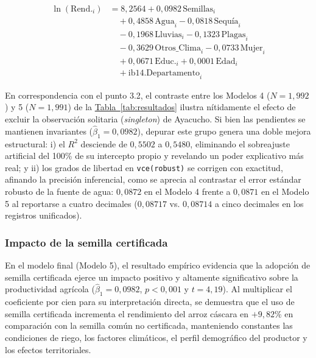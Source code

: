 \documentclass[11pt,a4paper,twocolumn]{article}
\begin{document}
\begin{equation}
\begin{split}
\ln(\text{Rend.}_i) &= 8{,}2564 + 0{,}0982 \, \text{Semillas}_i \\
&\quad + 0{,}4858 \, \text{Agua}_i - 0{,}0818 \, \text{Sequía}_i \\
&\quad - 0{,}1968 \, \text{Lluvias}_i - 0{,}1323 \, \text{Plagas}_i \\
&\quad - 0{,}3629 \, \text{Otros\_Clima}_i - 0{,}0733 \, \text{Mujer}_i \\
&\quad + 0{,}0671 \, \text{Educ.}_i + 0{,}0001 \, \text{Edad}_i \\
&\quad + \text{ib14.Departamento}_i
\end{split}
\end{equation}

En correspondencia con el punto 3.2, el contraste entre los Modelos 4 ($N=1{,}992$) y 5 ($N=1{,}991$) de la \hyperref[tab:resultados]{Tabla~\ref*{tab:resultados}} ilustra nítidamente el efecto de excluir la observación solitaria (\textit{singleton}) de Ayacucho. Si bien las pendientes se mantienen invariantes ($\hat{\beta}_1 = 0{,}0982$), depurar este grupo genera una doble mejora estructural: i) el $R^2$ desciende de $0{,}5502$ a $0{,}5480$, eliminando el sobreajuste artificial del 100\% de su intercepto propio y revelando un poder explicativo más real; y ii) los grados de libertad en \texttt{vce(robust)} se corrigen con exactitud, afinando la precisión inferencial, como se aprecia al contrastar el error estándar robusto de la fuente de agua: $0{,}0872$ en el Modelo 4 frente a $0{,}0871$ en el Modelo 5 al reportarse a cuatro decimales ($0{,}08717$ vs. $0{,}08714$ a cinco decimales en los registros unificados).

\subsubsection{Impacto de la semilla certificada}
En el modelo final (Modelo 5), el resultado empírico evidencia que la adopción de semilla certificada ejerce un impacto positivo y altamente significativo sobre la productividad agrícola ($\hat{\beta}_1 = 0{,}0982$, $p < 0{,}001$ y $t = 4{,}19$). Al multiplicar el coeficiente por cien para su interpretación directa, se demuestra que el uso de semilla certificada incrementa el rendimiento del arroz cáscara en $+9{,}82$\% en comparación con la semilla común no certificada, manteniendo constantes las condiciones de riego, los factores climáticos, el perfil demográfico del productor y los efectos territoriales.
\end{document}
